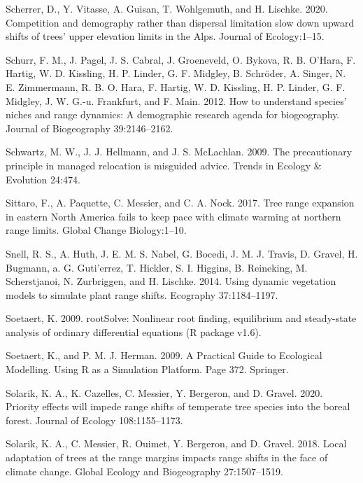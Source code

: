 \documentclass[12pt]{article}
\newlength{\cslhangindent}
\newenvironment{cslreferences}%
  {\setlength{\parindent}{0pt}%
  \everypar{\setlength{\hangindent}{\cslhangindent}}\ignorespaces}%
  {\par}
\begin{document}
\begin{cslreferences}
\leavevmode\hypertarget{ref-Scherrer2020}{}%
Scherrer, D., Y. Vitasse, A. Guisan, T. Wohlgemuth, and H. Lischke.
2020. Competition and demography rather than dispersal limitation slow
down upward shifts of trees' upper elevation limits in the Alps. Journal
of Ecology:1--15.

\leavevmode\hypertarget{ref-Schurr2012}{}%
Schurr, F. M., J. Pagel, J. S. Cabral, J. Groeneveld, O. Bykova, R. B.
O'Hara, F. Hartig, W. D. Kissling, H. P. Linder, G. F. Midgley, B.
Schröder, A. Singer, N. E. Zimmermann, R. B. O. Hara, F. Hartig, W. D.
Kissling, H. P. Linder, G. F. Midgley, J. W. G.-u. Frankfurt, and F.
Main. 2012. How to understand species' niches and range dynamics: A
demographic research agenda for biogeography. Journal of Biogeography
39:2146--2162.

\leavevmode\hypertarget{ref-Schwartz2009}{}%
Schwartz, M. W., J. J. Hellmann, and J. S. McLachlan. 2009. The
precautionary principle in managed relocation is misguided advice.
Trends in Ecology \& Evolution 24:474.

\leavevmode\hypertarget{ref-Sittaro2017}{}%
Sittaro, F., A. Paquette, C. Messier, and C. A. Nock. 2017. Tree range
expansion in eastern North America fails to keep pace with climate
warming at northern range limits. Global Change Biology:1--10.

\leavevmode\hypertarget{ref-Snell2014}{}%
Snell, R. S., A. Huth, J. E. M. S. Nabel, G. Bocedi, J. M. J. Travis, D.
Gravel, H. Bugmann, a. G. Guti\a'errez, T. Hickler, S. I. Higgins, B.
Reineking, M. Scherstjanoi, N. Zurbriggen, and H. Lischke. 2014. Using
dynamic vegetation models to simulate plant range shifts. Ecography
37:1184--1197.

\leavevmode\hypertarget{ref-Soetaert2009a}{}%
Soetaert, K. 2009. rootSolve: Nonlinear root finding, equilibrium and
steady-state analysis of ordinary differential equations (R package
v1.6).

\leavevmode\hypertarget{ref-Soetaert2009}{}%
Soetaert, K., and P. M. J. Herman. 2009. A Practical Guide to Ecological
Modelling. Using R as a Simulation Platform. Page 372. Springer.

\leavevmode\hypertarget{ref-Solarik2020}{}%
Solarik, K. A., K. Cazelles, C. Messier, Y. Bergeron, and D. Gravel.
2020. Priority effects will impede range shifts of temperate tree
species into the boreal forest. Journal of Ecology 108:1155--1173.

\leavevmode\hypertarget{ref-Solarik2018}{}%
Solarik, K. A., C. Messier, R. Ouimet, Y. Bergeron, and D. Gravel. 2018.
Local adaptation of trees at the range margins impacts range shifts in
the face of climate change. Global Ecology and Biogeography
27:1507--1519.


\end{cslreferences}
\end{document}
